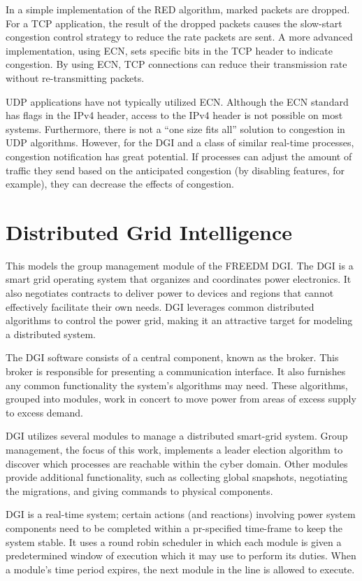 In a simple implementation of the \ac{RED} algorithm, marked packets are dropped.
For a TCP application, the result of the dropped packets causes the slow-start congestion control strategy to reduce the rate packets are sent.
A more advanced implementation, using \ac{ECN}, sets specific bits in the TCP header to indicate congestion.
By using \ac{ECN}, TCP connections can reduce their transmission rate without re-transmitting packets.

UDP applications have not typically utilized \ac{ECN}.
Although the \ac{ECN} standard has flags in the IPv4 header, access to the IPv4 header is not possible on most systems.
Furthermore, there is not a ``one size fits all'' solution to congestion in UDP algorithms.
However, for the \ac{DGI} and a class of similar real-time processes, congestion notification has great potential.
If processes can adjust the amount of traffic they send based on the anticipated congestion (by disabling features, for example), they can decrease the effects of congestion.

\section{Distributed Grid Intelligence}

This models the group management module of the FREEDM DGI.
The DGI is a smart grid operating system that organizes and coordinates power electronics.
It also negotiates contracts to deliver power to devices and regions that cannot effectively facilitate their own needs.
DGI leverages common distributed algorithms to control the power grid, making it an attractive target for modeling a distributed system.

The DGI software consists of a central component, known as the broker.
This broker is responsible for presenting a communication interface.
It also furnishes any common functionality the system's algorithms may need.
These algorithms, grouped into modules, work in concert to move power from areas of excess supply to excess demand.

DGI utilizes several modules to manage a distributed smart-grid system.
Group management, the focus of this work, implements a leader election algorithm to discover which processes are reachable within the cyber domain.
Other modules provide additional functionality, such as collecting global snapshots, negotiating the migrations, and giving commands to physical components.

DGI is a real-time system; certain actions (and reactions) involving power system components need to be completed within a pr-specified time-frame to keep the system stable.
It uses a round robin scheduler in which each module is given a predetermined window of execution which it may use to perform its duties.
When a module's time period expires, the next module in the line is allowed to execute. 

